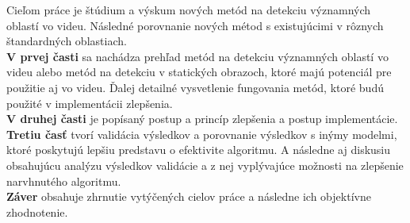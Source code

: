 Cieľom práce je štúdium a výskum nových metód na detekciu významných oblastí vo videu.
Následné porovnanie nových métod s existujúcimi v rôznych štandardných oblastiach.
\\
\textbf{V prvej časti} sa nachádza prehľad metód na detekciu významných oblastí vo videu alebo metód na detekciu v statických obrazoch, ktoré majú potenciál pre použitie aj vo videu.
Ďalej detailné vysvetlenie fungovania metód, ktoré budú použité v implementácii zlepšenia.
\\
\textbf{V druhej časti} je popísaný postup a princíp zlepšenia a postup implementácie.
\\
\textbf{Tretiu časť} tvorí validácia výsledkov a porovnanie výsledkov s inýmy modelmi, ktoré poskytujú lepšiu predstavu o efektivite algoritmu. A následne aj diskusiu obsahujúcu analýzu výsledkov validácie a z nej vyplývajúce možnosti na zlepšenie narvhnutého algoritmu.
\\
\textbf{Záver} obsahuje zhrnutie vytýčených cielov práce a následne ich objektívne zhodnotenie.